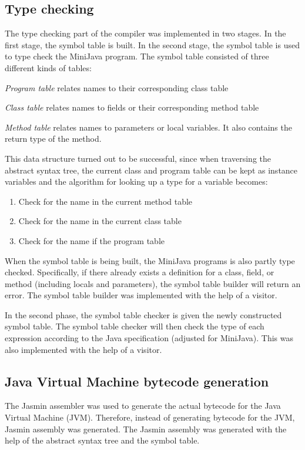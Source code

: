 \documentclass[11pt,oneside,a4paper]{article}
\begin{document}
\subsection{Type checking}
The type checking part of the compiler was implemented in two stages. In the
first stage, the symbol table is built. In the second stage, the symbol table
is used to type check the MiniJava program. The symbol table consisted of three
different kinds of tables:
\begin{description}
\item{\emph{Program table}} relates names to their corresponding class table
\item{\emph{Class table}} relates names to fields or their corresponding method
table
\item{\emph{Method table}} relates names to parameters or local variables. It 
also contains the return type of the method.
\end{description}
This data structure turned out to be successful, since when traversing the
abstract syntax tree, the current class and program table can be kept as
instance variables and the algorithm for looking up a type for a variable
becomes:
\begin{enumerate}
\item Check for the name in the current method table
\item Check for the name in the current class table
\item Check for the name if the program table
\end{enumerate}

When the symbol table is being built, the MiniJava programs is also partly type
checked. Specifically, if there already exists a definition for a class, field,
or method (including locals and parameters), the symbol table builder will 
return an error. The symbol table builder was implemented with the help of a 
visitor.

In the second phase, the symbol table checker is given the newly constructed 
symbol table. The symbol table checker will then check the type of each
expression according to the Java specification (adjusted for MiniJava). This
was also implemented with the help of a visitor.

\subsection{Java Virtual Machine bytecode generation}
The Jasmin assembler was used to generate the actual bytecode for the Java
Virtual Machine (JVM). Therefore, instead of generating bytecode for the JVM,
Jasmin assembly was generated. The Jasmin assembly was generated with the help
of the abstract syntax tree and the symbol table. 
\end{document}
